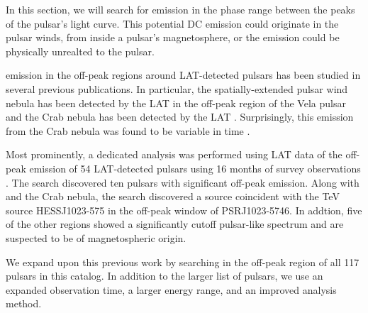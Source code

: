 
In this section, we will search for emission in the phase range between
the peaks of the pulsar's light curve. This potential DC emission could originate
in the pulsar winds, from inside a pulsar's magnetosphere, or 
the emission could be physically unrealted to the pulsar.

\gev emission in the off-peak regions around LAT-detected
pulsars has been studied in several previous publications. In
particular, the spatially-extended \velax pulsar wind nebula has
been detected by the LAT in the off-peak region of the Vela pulsar
\citep{LAT_collaboration_Vela_X_2010} and the Crab nebula has been
detected by the LAT \citep{LAT_collaboration_crab_2010}.  Surprisingly,
this \gev emission from the Crab nebula was found to be variable in
time \citep{LAT_Collaboration_Crab_Flare_2011}.

Most prominently, a dedicated analysis was performed using LAT data of
the off-peak emission of 54 LAT-detected pulsars using 16 months of survey
observations \citep{LAT_collaboration_PWNCAT_2011}.  The search discovered
ten pulsars with significant off-peak emission.  Along with \velax and the
Crab nebula, the search discovered a source coincident with the TeV source
HESS\;J1023-575 in the off-peak window of PSR\;J1023-5746. In addtion,
five of the other regions showed a significantly cutoff pulsar-like
spectrum and are suspected to be of magnetospheric origin.

We expand upon this previous work by searching in the off-peak region
of all 117 pulsars in this catalog. In addition to the larger list of
pulsars, we use an expanded observation time, a larger energy range,
and an improved analysis method.
